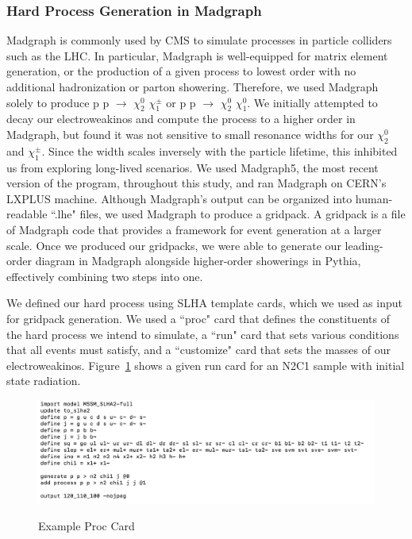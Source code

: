 \documentclass{article}
\begin{document}
\subsubsection{Hard Process Generation in Madgraph}
Madgraph is commonly used by CMS to simulate processes in particle colliders such as the LHC. In particular, Madgraph is well-equipped for matrix element generation, or the production of a given process to lowest order with no additional hadronization or parton showering. Therefore, we used Madgraph solely to produce p p $\rightarrow$ $\chi^{0}_{2}$ $\chi^{\pm}_{1}$  or p p $\rightarrow$ $\chi^{0}_{2}$ $\chi^{0}_{1}$. We initially attempted to decay our electroweakinos and compute the process to a higher order in Madgraph, but found it was not sensitive to small resonance widths for our $\chi^{0}_{2}$  and $\chi^{\pm}_{1}$. Since the width scales inversely with the particle lifetime, this inhibited us from exploring long-lived scenarios. We used Madgraph5, the most recent version of the program, throughout this study, and ran Madgraph on CERN's LXPLUS machine. Although Madgraph's output can be organized into human-readable ``.lhe" files, we used Madgraph to produce a gridpack. A gridpack is a file of Madgraph code that provides a framework for event generation at a larger scale. Once we produced our gridpacks, we were able to generate our leading-order diagram in Madgraph alongside higher-order showerings in Pythia, effectively combining two steps into one.
\par
We defined our hard process using SLHA template cards, which we used as input for gridpack generation. We used a ``proc" card that defines the constituents of the hard process we intend to simulate, a ``run" card that sets various conditions that all events must satisfy, and a ``customize" card that sets the masses of our electroweakinos. Figure~\ref{fig:6} shows a given run card for an N2C1 sample with initial state radiation.
\begin{figure}[H]
    \centering
    \caption{Example Proc Card} 
    \includegraphics[width=12cm]{Proc_Card.png}
    \label{fig:6}
\end{figure}
\par
\end{document}
